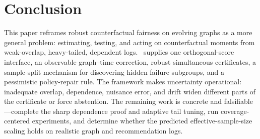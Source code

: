 \section{Conclusion}
\label{sec:conclusion}

This paper reframes robust counterfactual fairness on evolving graphs as a more general problem: estimating, testing, and acting on counterfactual moments from weak-overlap, heavy-tailed, dependent logs. \COMET\ supplies one orthogonal-score interface, an observable graph--time correction, robust simultaneous certificates, a sample-split mechanism for discovering hidden failure subgroups, and a pessimistic policy-repair rule. The framework makes uncertainty operational: inadequate overlap, dependence, nuisance error, and drift widen different parts of the certificate or force abstention. The remaining work is concrete and falsifiable---complete the sharp dependence proof and adaptive tail tuning, run coverage-centered experiments, and determine whether the predicted effective-sample-size scaling holds on realistic graph and recommendation logs.
